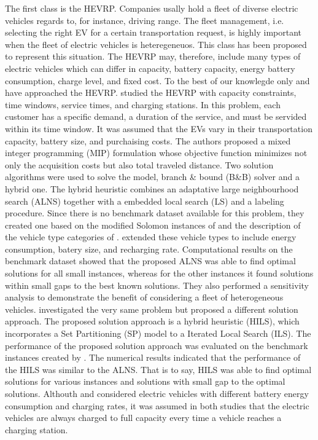 \documentclass[11pt]{article}
\begin{document}
The first class is the HEVRP. Companies usally hold a fleet of diverse electric vehicles regards to, for instance, driving range. The fleet management, i.e. selecting the right EV for a certain transportation request, is highly important when the fleet of electric vehicles is heteregeneuos. This class has been proposed to represent this situation. The HEVRP may, therefore, include many types of electric vehicles which can differ in capacity, battery capacity, energy battery consumption, charge level, and fixed cost. To the best of our knowlegde only  \cite{Hiermann2016} and \cite{Penha2016} have approached the HEVRP. \cite{Hiermann2016} studied the HEVRP with capacity constraints, time windows, service times, and charging stations. In this problem, each customer has a specific demand, a duration of the service, and must be servided within its time window. It was assumed that the EVs vary in their transportation capacity, battery size, and purchaising costs. The authors proposed a mixed integer programming (MIP) formulation whose objective function minimizes not only the acquisition costs but also total traveled distance. Two solution algorithms were used to solve the model, branch \& bound (B\&B) solver and a hybrid one. The hybrid heuristic combines an adaptative large neighbourhood search (ALNS) together with a embedded local search (LS) and a labeling procedure. Since there is no benchmark dataset available for this problem, they created one based on the modified Solomon instances of \cite{Schneider2014} and the description of the vehicle type categories of \cite{Liu1999}. \cite{Hiermann2016} extended these vehicle types to include energy consumption, batery size, and recharging rate. Computational results on the benchmark dataset showed that the proposed ALNS was able to find optimal solutions for all small instances, whereas for the other instances it found solutions within small gaps to the best known solutions. They also performed a sensitivity analysis to demonstrate the benefit of considering a fleet of heterogeneous vehicles. \cite{Penha2016} investigated the very same problem but proposed a different solution approach. The proposed solution approach is a hybrid heuristic (HILS), which incorporates a Set Partitioning (SP) model to a Iterated Local Search (ILS). The performance of the proposed solution approach was evaluated on the benchmark instances created by \cite{Hiermann2016}. The numerical results indicated that the performance of the HILS was similar to the ALNS. That is to say, HILS was able to find optimal solutions for various instances and solutions with small gap to the optimal solutions. Althouth \cite{Hiermann2016} and \cite{Penha2016} considered electric vehicles with different battery energy consumption and charging rates, it was assumed in both studies that the electric vehicles are always charged to full capacity every time a vehicle reaches a charging station. 
\end{document}
